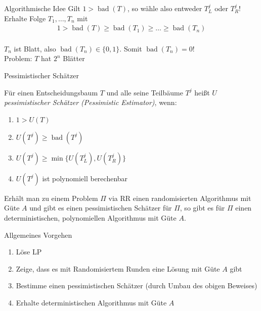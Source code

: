\documentclass{beamer}
\DeclareMathOperator{\bad}{bad}
\newcommand{\set}[1]{\{#1\}}
\begin{document}
\begin{frame}{Algorithmische Idee}
  Gilt $1>\bad(T)$, so wähle also entweder $T^{j}_{L}$ oder $T^{j}_{R}$!\\\pause
  Erhalte Folge $T_{1},\ldots,T_{n}$ mit
  \begin{align*}
    1>\bad(T)\geq \bad(T_{1}) \geq \ldots \geq \bad(T_{n})
  \end{align*}\\\pause
  $T_{n}$ ist Blatt, also $\bad(T_{n})\in \set{0,1}$. Somit $\bad(T_{n})=0$!\\
  \pause
  Problem: $T$ hat $2^{n}$ Blätter
  
\end{frame}
\begin{frame}{Pessimistischer Schätzer}
  \begin{definition}
    Für einen Entscheidungsbaum $T$ und alle seine Teilbäume $T^{j}$ heißt $U$
    \emph{pessimistischer Schätzer (Pessimistic Estimator)}, wenn:
    \begin{enumerate}
    \item $1>U(T)$
    \item $U(T^{j})\geq \bad(T^{j})$
    \item $U(T^{j})\geq \min\set{U(T^{j}_{L}),U(T^{j}_{R})}$
    \item $U(T^{j})$ ist polynomiell berechenbar
    \end{enumerate}
  \end{definition}\pause
  \begin{theorem}[Hauptsatz]
    Erhält man zu einem Problem $\Pi$ via RR einen randomisierten Algorithmus
    mit Güte $A$ und gibt es einen pessimistischen Schätzer für $\Pi$,
    so gibt es für $\Pi$ einen deterministischen, polynomiellen
    Algorithmus mit Güte $A$.
  \end{theorem}
\end{frame}
\begin{frame}[label=allgemein]{Allgemeines Vorgehen}
  \begin{enumerate}
  \item Löse LP
  \item Zeige, dass es mit Randomisiertem Runden eine Lösung mit Güte
    $A$ gibt
  \item Bestimme einen pessimistischen Schätzer (durch Umbau des obigen Beweises)
  \item Erhalte deterministischen Algorithmus mit Güte $A$
  \end{enumerate}
\end{frame}
\end{document}
